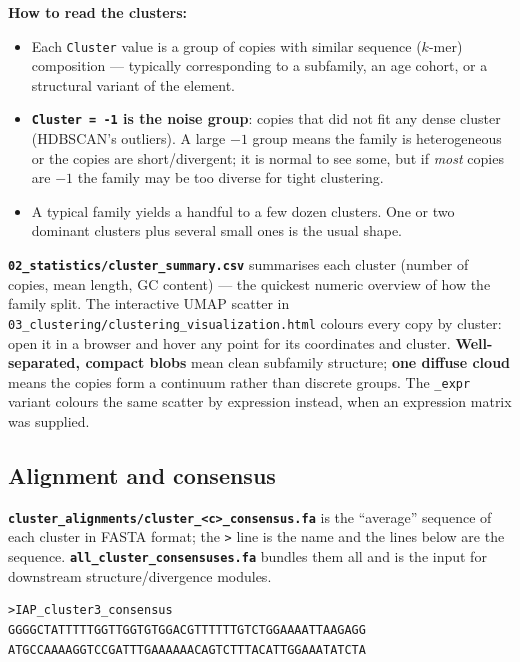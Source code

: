 \documentclass[11pt]{article}
\begin{document}
\noindent\textbf{How to read the clusters:}
\begin{itemize}[itemsep=2pt]
  \item Each \texttt{Cluster} value is a group of copies with similar
        sequence ($k$-mer) composition --- typically corresponding to a
        subfamily, an age cohort, or a structural variant of the element.
  \item \textbf{\texttt{Cluster = -1} is the noise group}: copies that did
        not fit any dense cluster (HDBSCAN's outliers). A large $-1$ group
        means the family is heterogeneous or the copies are short/divergent;
        it is normal to see some, but if \emph{most} copies are $-1$ the
        family may be too diverse for tight clustering.
  \item A typical family yields a handful to a few dozen clusters. One or
        two dominant clusters plus several small ones is the usual shape.
\end{itemize}

\textbf{\texttt{02\_statistics/cluster\_summary.csv}} summarises each
cluster (number of copies, mean length, GC content) --- the quickest
numeric overview of how the family split. The interactive UMAP scatter in
\texttt{03\_clustering/clustering\_visualization.html} colours every copy
by cluster: open it in a browser and hover any point for its coordinates
and cluster. \textbf{Well-separated, compact blobs} mean clean subfamily
structure; \textbf{one diffuse cloud} means the copies form a continuum
rather than discrete groups. The \texttt{\_expr} variant colours the same
scatter by expression instead, when an expression matrix was supplied.

\subsection{Alignment and consensus}

\textbf{\texttt{cluster\_alignments/cluster\_<c>\_consensus.fa}} is the
``average'' sequence of each cluster in FASTA format; the \texttt{>} line
is the name and the lines below are the sequence.
\textbf{\texttt{all\_cluster\_consensuses.fa}} bundles them all and is
the input for downstream structure/divergence modules.

\begin{lstlisting}
>IAP_cluster3_consensus
GGGGCTATTTTTGGTTGGTGTGGACGTTTTTTGTCTGGAAAATTAAGAGG
ATGCCAAAAGGTCCGATTTGAAAAAACAGTCTTTACATTGGAAATATCTA
\end{lstlisting}
\end{document}
